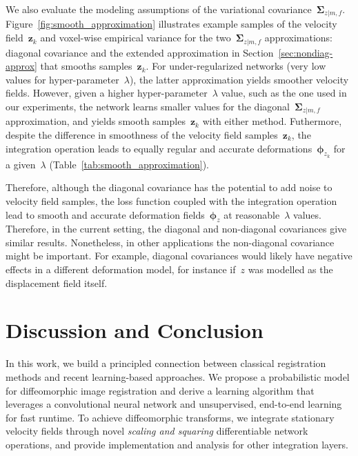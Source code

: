 \documentclass{article}
\newcommand{\bphi}{\boldsymbol{\phi}}
\newcommand{\bSigma}{\boldsymbol{\Sigma}}
\newcommand{\bz}{\boldsymbol{z}}
\newcommand{\moving}{m}
\newcommand{\fixed}{f}
\begin{document}
	
	We also evaluate the modeling assumptions of the variational covariance~$\bSigma_{z |\moving, \fixed}$. Figure~\ref{fig:smooth_approximation} illustrates example samples of the velocity field~$\bz_k$ and voxel-wise empirical variance for the two~$\bSigma_{z | \moving, \fixed}$ approximations: diagonal covariance and the extended approximation in Section~\ref{sec:nondiag-approx} that smooths samples~$\bz_k$. For under-regularized networks (very low values for hyper-parameter~$\lambda$), the latter approximation yields smoother velocity fields. However, given a higher hyper-parameter~$\lambda$ value, such as the one used in our experiments, the network learns smaller values for the diagonal~$\bSigma_{z | \moving, \fixed}$ approximation, and yields smooth samples~$\bz_k$ with either method. Futhermore, despite the difference in smoothness of the velocity field samples~$\bz_k$, the integration operation leads to equally regular and accurate deformations~$\bphi_{z_k}$ for a given~$\lambda$ (Table~\ref{tab:smooth_approximation}). 
	
	Therefore, although the diagonal covariance has the potential to add noise to velocity field samples, the loss function coupled with the integration operation lead to smooth and accurate deformation fields~$\bphi_z$ at reasonable~$\lambda$ values.  {\color{blue}Therefore, in the current setting, the diagonal and non-diagonal covariances give similar results.
	Nonetheless, in other applications the non-diagonal covariance might be important. For example,
	diagonal covariances would likely have negative effects in a different deformation model, for instance if~$z$ was modelled as the displacement field itself.}



 
\vspace{0.2cm}
\section{Discussion and Conclusion}


In this work, we build a principled connection between classical registration methods and recent learning-based approaches. We propose a probabilistic model for diffeomorphic image registration and derive a learning algorithm that leverages a convolutional neural network and unsupervised, end-to-end learning for fast runtime. To achieve diffeomorphic transforms, we integrate stationary velocity fields through novel \textit{scaling and squaring} differentiable network operations, and provide implementation and analysis for other integration layers. 
\end{document}
